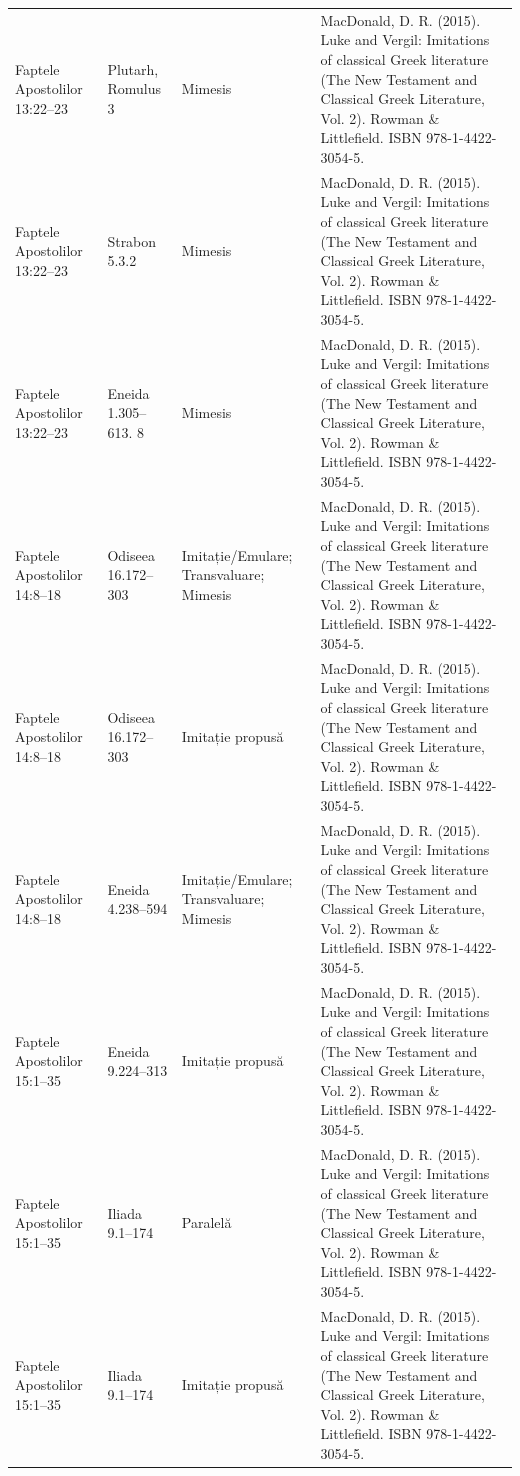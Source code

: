\documentclass[12pt,a4paper,twoside,openany]{book}
\begin{document}
\begin{longtable}{L{1.4cm}L{1.7cm}L{3.1cm}L{8.4cm}}
Faptele Apostolilor 13:22–23 & Plutarh, Romulus 3 & Mimesis & MacDonald, D. R. (2015). Luke and Vergil: Imitations of classical Greek literature (The New Testament and Classical Greek Literature, Vol. 2). Rowman \& Littlefield. ISBN 978-1-4422-3054-5. \\
Faptele Apostolilor 13:22–23 & Strabon 5.3.2 & Mimesis & MacDonald, D. R. (2015). Luke and Vergil: Imitations of classical Greek literature (The New Testament and Classical Greek Literature, Vol. 2). Rowman \& Littlefield. ISBN 978-1-4422-3054-5. \\
Faptele Apostolilor 13:22–23 & Eneida 1.305–613. 8 & Mimesis & MacDonald, D. R. (2015). Luke and Vergil: Imitations of classical Greek literature (The New Testament and Classical Greek Literature, Vol. 2). Rowman \& Littlefield. ISBN 978-1-4422-3054-5. \\
Faptele Apostolilor 14:8–18 & Odiseea 16.172–303 & Imitație/Emulare; Transvaluare; Mimesis & MacDonald, D. R. (2015). Luke and Vergil: Imitations of classical Greek literature (The New Testament and Classical Greek Literature, Vol. 2). Rowman \& Littlefield. ISBN 978-1-4422-3054-5. \\
Faptele Apostolilor 14:8–18 & Odiseea 16.172–303 & Imitație propusă & MacDonald, D. R. (2015). Luke and Vergil: Imitations of classical Greek literature (The New Testament and Classical Greek Literature, Vol. 2). Rowman \& Littlefield. ISBN 978-1-4422-3054-5. \\
Faptele Apostolilor 14:8–18 & Eneida 4.238–594 & Imitație/Emulare; Transvaluare; Mimesis & MacDonald, D. R. (2015). Luke and Vergil: Imitations of classical Greek literature (The New Testament and Classical Greek Literature, Vol. 2). Rowman \& Littlefield. ISBN 978-1-4422-3054-5. \\
Faptele Apostolilor 15:1–35 & Eneida 9.224–313 & Imitație propusă & MacDonald, D. R. (2015). Luke and Vergil: Imitations of classical Greek literature (The New Testament and Classical Greek Literature, Vol. 2). Rowman \& Littlefield. ISBN 978-1-4422-3054-5. \\
Faptele Apostolilor 15:1–35 & Iliada 9.1–174 & Paralelă & MacDonald, D. R. (2015). Luke and Vergil: Imitations of classical Greek literature (The New Testament and Classical Greek Literature, Vol. 2). Rowman \& Littlefield. ISBN 978-1-4422-3054-5. \\
Faptele Apostolilor 15:1–35 & Iliada 9.1–174 & Imitație propusă & MacDonald, D. R. (2015). Luke and Vergil: Imitations of classical Greek literature (The New Testament and Classical Greek Literature, Vol. 2). Rowman \& Littlefield. ISBN 978-1-4422-3054-5. \\

\end{longtable}
\end{document}
